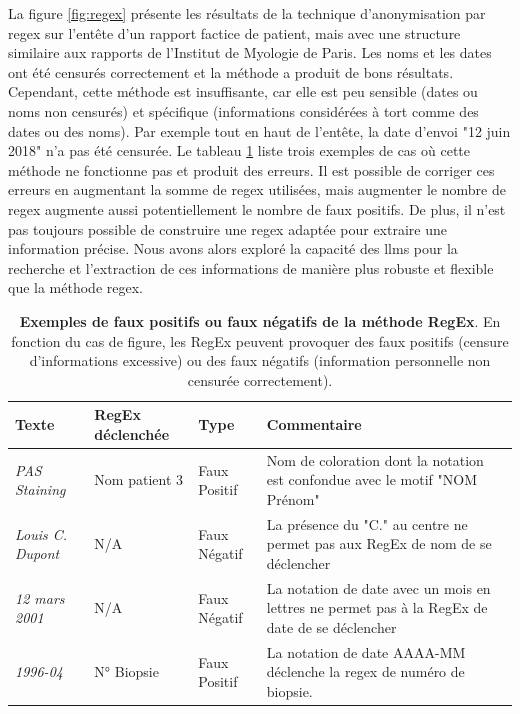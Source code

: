 La figure \ref{fig:regex} présente les résultats de la technique d'anonymisation par \gls{regex} sur l'entête d'un rapport factice de patient, mais avec une structure similaire aux rapports de l'Institut de Myologie de Paris. Les noms et les dates ont été censurés correctement et la méthode a produit de bons résultats. Cependant, cette méthode est insuffisante, car elle est peu sensible (dates ou noms non censurés) et spécifique (informations considérées à tort comme des dates ou des noms). Par exemple tout en haut de l'entête, la date d'envoi "12 juin 2018" n'a pas été censurée. Le tableau \ref{tab:regex_fail} liste trois exemples de cas où cette méthode ne fonctionne pas et produit des erreurs. Il est possible de corriger ces erreurs en augmentant la somme de \gls{regex} utilisées, mais augmenter le nombre de \gls{regex} augmente aussi potentiellement le nombre de faux positifs. De plus, il n'est pas toujours possible de construire une \gls{regex} adaptée pour extraire une information précise. Nous avons alors exploré la capacité des \gls{llms} pour la recherche et l'extraction de ces informations de manière plus robuste et flexible que la méthode \gls{regex}.
\begin{table}[!htbp]
\centering
\caption[Exemples de faux positifs ou faux négatifs de la méthode RegEx]{\textbf{Exemples de faux positifs ou faux négatifs de la méthode RegEx}. En fonction du cas de figure, les RegEx peuvent provoquer des faux positifs (censure d'informations excessive) ou des faux négatifs (information personnelle non censurée correctement).}
\label{tab:regex_fail}
\begin{tabularx}{\textwidth}{|l|l|l|X|}
\hline
\textbf{Texte} & \textbf{RegEx déclenchée} & \textbf{Type} & \textbf{Commentaire} \\ \hline
\textit{PAS Staining} & Nom patient 3 & Faux Positif & Nom de coloration dont la notation est confondue avec le motif "NOM Prénom" \\ \hline
\textit{Louis C. Dupont} & N/A & Faux Négatif & La présence du "C." au centre ne permet pas aux RegEx de nom de se déclencher \\ \hline
\textit{12 mars 2001} & N/A & Faux Négatif & La notation de date avec un mois en lettres ne permet pas à la RegEx de date de se déclencher \\ \hline
\textit{1996-04} & N° Biopsie & Faux Positif & La notation de date AAAA-MM déclenche la \gls{regex} de numéro de biopsie. \\ \hline
\end{tabularx}
\end{table}

